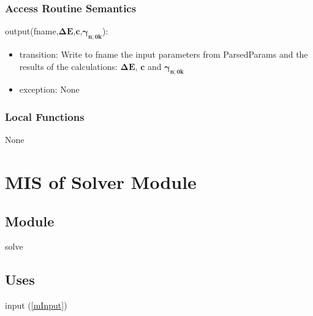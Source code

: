 \documentclass[12pt, titlepage]{article}
\begin{document}

\subsubsection{Access Routine Semantics}

\noindent output(fname,$\boldsymbol{\Delta 
E}$,$\boldsymbol{c}$,$\boldsymbol{\gamma_{n;0k}}$):
\begin{itemize}
	\item transition: Write to fname the input parameters from ParsedParams and 
	the results of the calculations: $\boldsymbol{\Delta 
		E}$, $\boldsymbol{c}$ and $\boldsymbol{\gamma_{n;0k}}$
	\item exception: None
\end{itemize}

%

\subsubsection{Local Functions}

None

\newpage

\section{MIS of Solver Module} \label{mGEP}

\subsection{Module}

solve

\subsection{Uses}
input (\ref{mInput})
\end{document}
